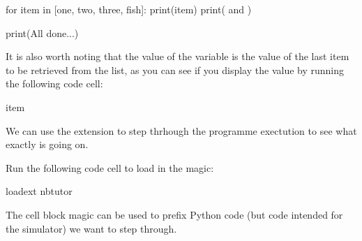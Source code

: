 \documentclass[letterpaper,10pt,english]{sphinxmanual}
\begin{document}
{
\begin{sphinxVerbatim}[commandchars=\\\{\}]
\llap{\color{nbsphinxin}[ ]:\,\hspace{\fboxrule}\hspace{\fboxsep}}for item in [\PYGZsq{}one\PYGZsq{}, \PYGZsq{}two\PYGZsq{}, \PYGZsq{}three\PYGZsq{}, \PYGZsq{}fish\PYGZsq{}]:
    print(item)
    print(\PYGZsq{} and \PYGZsq{})

print(\PYGZsq{}All done...\PYGZsq{})
\end{sphinxVerbatim}
}

It is also worth noting that the value of the  variable is the value of the last item to be retrieved from the list, as you can see if you display the value by running the following code cell:

{
\begin{sphinxVerbatim}[commandchars=\\\{\}]
\llap{\color{nbsphinxin}[ ]:\,\hspace{\fboxrule}\hspace{\fboxsep}}item
\end{sphinxVerbatim}
}

We can use the  extension to step thrhough the programme exectution to see what exactly is going on.

Run the following code cell to load in the  magic:

{
\begin{sphinxVerbatim}[commandchars=\\\{\}]
\llap{\color{nbsphinxin}[ ]:\,\hspace{\fboxrule}\hspace{\fboxsep}}\PYGZpc{}load\PYGZus{}ext nbtutor
\end{sphinxVerbatim}
}

The  cell block magic can be used to prefix Python code (but  code intended for the simulator) we want to step through.

\end{document}
